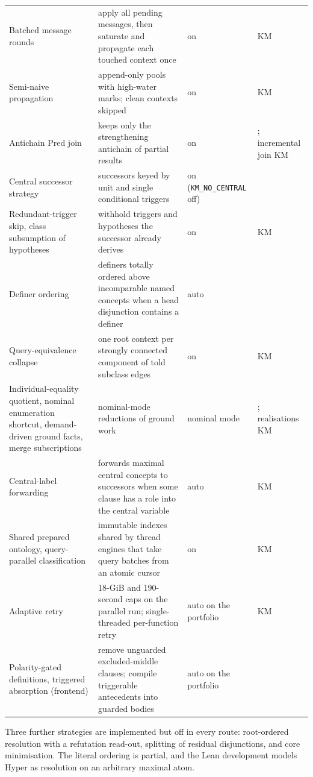\begin{small}
\begin{longtable}{@{}p{}p{}p{}p{}@{}}
Batched message rounds & apply all pending messages, then saturate and propagate each touched context once & on & KM\\
Semi-naive propagation & append-only pools with high-water marks; clean contexts skipped & on & KM\\
Antichain Pred join & keeps only the strengthening antichain of partial results & on & \cite{tenacucala2019sequoia}; incremental join KM\\
Central successor strategy & successors keyed by unit and single conditional triggers & on (\texttt{KM\_NO\_CENTRAL} off) & \cite{bate2016sriq,simancik2014fpt}\\
Redundant-trigger skip, class subsumption of hypotheses & withhold triggers and hypotheses the successor already derives & on & KM\\
Definer ordering & definers totally ordered above incomparable named concepts when a head disjunction contains a definer & auto & \cite{tenacucala2021payg}\\
Query-equivalence collapse & one root context per strongly connected component of told subclass edges & on & KM\\
Individual-equality quotient, nominal enumeration shortcut, demand-driven ground facts, merge subscriptions & nominal-mode reductions of ground work & nominal mode & \cite{tenacucala2018ijcai}; realisations KM\\
Central-label forwarding & forwards maximal central concepts to successors when some clause has a role into the central variable & auto & KM\\
Shared prepared ontology, query-parallel classification & immutable indexes shared by thread engines that take query batches from an atomic cursor & on & KM\\
Adaptive retry & 18-GiB and 190-second caps on the parallel run; single-threaded per-function retry & auto on the portfolio & KM\\
Polarity-gated definitions, triggered absorption (frontend) & remove unguarded excluded-middle clauses; compile triggerable antecedents into guarded bodies & auto on the portfolio & \cite{plaisted1986structure,steigmiller2014absorption}\\
\bottomrule
\end{longtable}
\end{small}

Three further strategies are implemented but off in every route: root-ordered
resolution with a refutation read-out, splitting of residual disjunctions,
and core minimisation.  The literal ordering is partial, and the Lean
development models Hyper as resolution on an arbitrary maximal atom.

